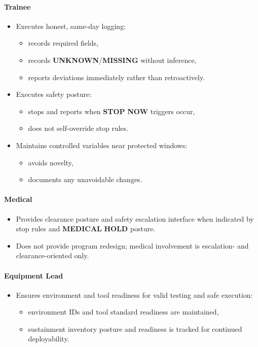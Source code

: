 \documentclass[10pt]{article}
\begin{document}
\paragraph*{Trainee}

\begin{itemize}
\item Executes honest, same-day logging:
  \begin{itemize}
  \item records required fields,
  \item records \textbf{UNKNOWN}/\textbf{MISSING} without inference,
  \item reports deviations immediately rather than retroactively.
  \end{itemize}
\item Executes safety posture:
  \begin{itemize}
  \item stops and reports when \textbf{STOP} \textbf{NOW} triggers occur,
  \item does not self-override stop rules.
  \end{itemize}
\item Maintains controlled variables near protected windows:
  \begin{itemize}
  \item avoids novelty,
  \item documents any unavoidable changes.
  \end{itemize}
\end{itemize}

\paragraph*{Medical}

\begin{itemize}
\item Provides clearance posture and safety escalation interface when indicated by stop rules and \textbf{MEDICAL} \textbf{HOLD} posture.
\item Does not provide program redesign; medical involvement is escalation- and clearance-oriented only.
\end{itemize}

\paragraph*{Equipment Lead}

\begin{itemize}
\item Ensures environment and tool readiness for valid testing and safe execution:
  \begin{itemize}
  \item environment IDs and tool standard readiness are maintained,
  \item sustainment inventory posture and readiness is tracked for continued deployability.
  \end{itemize}
\end{itemize}
\end{document}
